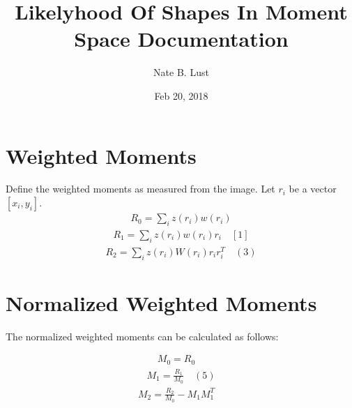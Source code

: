 \documentclass[letterpaper,10pt,english]{sphinxmanual}
\title{Likelyhood Of Shapes In Moment Space Documentation}
\date{Feb 20, 2018}
\author{Nate B. Lust}
\begin{document}
\maketitle
\sphinxtableofcontents
{}\label{\detokenize{algorithmWriteup::doc}}



\chapter{Weighted Moments}
\label{\detokenize{algorithmWriteup:construction-of-a-likelyhood-function-for-the-moments-of-an-image}}\label{\detokenize{algorithmWriteup:weighted-moments}}
Define the weighted moments as measured from the image. Let \(r_i\) be a
vector \([x_i,y_i]\).
\begin{equation*}
\begin{split}R_0 = \sum_i z(r_i)w(r_i)\end{split}
\end{equation*}\label{\detokenize{algorithmWriteup:equation-first_raw_moment}}\begin{equation}\label{equation:algorithmWriteup:first_raw_moment}
\begin{split}R_1 = \sum_i z(r_i)w(r_i)r_i \quad [1]\end{split}
\end{equation}\label{\detokenize{algorithmWriteup:equation-second_raw_moment}}\begin{equation}\label{equation:algorithmWriteup:second_raw_moment}
\begin{split}R_2 = \sum_i z(r_i)W(r_i)r_ir_i^T \quad (3)\end{split}
\end{equation}

\chapter{Normalized Weighted Moments}
\label{\detokenize{algorithmWriteup:normalized-weighted-moments}}
The normalized weighted moments can be calculated as follows:

\label{\detokenize{algorithmWriteup:equation-zeroth_norm_moment}}\begin{equation}\label{equation:algorithmWriteup:zeroth_norm_moment}
\begin{split}M_0 = R_0 \quad\end{split}
\end{equation}\label{\detokenize{algorithmWriteup:equation-first_norm_moment}}\begin{equation}\label{equation:algorithmWriteup:first_norm_moment}
\begin{split}M_1 = \frac{R_1}{M_0} \quad(5)\end{split}
\end{equation}\label{\detokenize{algorithmWriteup:equation-second_norm_moment}}\begin{equation}\label{equation:algorithmWriteup:second_norm_moment}
\begin{split}M_ 2 = \frac{R_2}{M_0} - M_1M_1^T \quad\end{split}
\end{equation}
\end{document}
